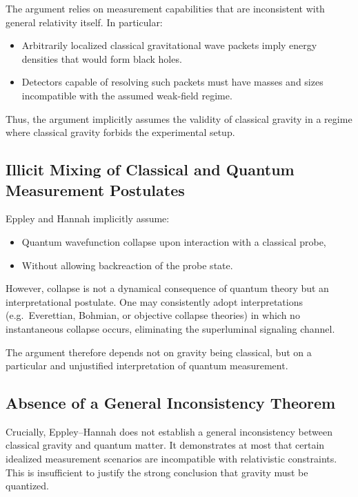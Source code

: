 \documentclass[12pt]{article}
\begin{document}
The argument relies on measurement capabilities that are inconsistent with
general relativity itself. In particular:
\begin{itemize}
    \item Arbitrarily localized classical gravitational wave packets imply
        energy densities that would form black holes.
    \item Detectors capable of resolving such packets must have masses and
        sizes incompatible with the assumed weak-field regime.
\end{itemize}

Thus, the argument implicitly assumes the validity of classical gravity in a
regime where classical gravity forbids the experimental setup.

\subsection{Illicit Mixing of Classical and Quantum Measurement Postulates}

Eppley and Hannah implicitly assume:
\begin{itemize}
    \item Quantum wavefunction collapse upon interaction with a classical probe,
    \item Without allowing backreaction of the probe state.
\end{itemize}

However, collapse is not a dynamical consequence of quantum theory but an
interpretational postulate. One may consistently adopt interpretations (e.g.\
Everettian, Bohmian, or objective collapse theories) in which no instantaneous
collapse occurs, eliminating the superluminal signaling channel.

The argument therefore depends not on gravity being classical, but on a
particular and unjustified interpretation of quantum measurement.

\subsection{Absence of a General Inconsistency Theorem}

Crucially, Eppley--Hannah does not establish a general inconsistency between
classical gravity and quantum matter. It demonstrates at most that certain
idealized measurement scenarios are incompatible with relativistic constraints.
This is insufficient to justify the strong conclusion that gravity must be
quantized.
\end{document}
